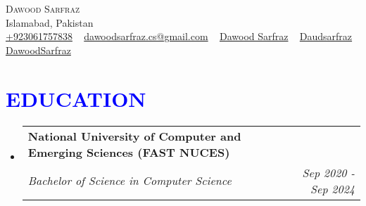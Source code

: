 \documentclass[letterpaper,11pt]{article}
\makeatletter
\newcommand{\resumeSubheading}[4]{
	\vspace{-2pt}\item
	\begin{tabular*}{1.0\textwidth}[t]{l@{\extracolsep{\fill}}r}
		\textbf{\large#1} & \textbf{\small #2} \\
		\textit{\large#3} & \textit{\small #4} \\
		
	\end{tabular*}\vspace{-7pt}
}
\newcommand{\resumeSubHeadingListStart}{\begin{itemize}[leftmargin=0.0in, label={}]}
\newcommand{\resumeSubHeadingListEnd}{\end{itemize}}
\makeatother
\begin{document}
	
	
	
	\begin{center}
		{\Huge \scshape Dawood Sarfraz} \\ \vspace{1pt}
		Islamabad, Pakistan \\ \vspace{1pt}
		\small 
		\href{tel:+9203061757838}{\raisebox{-0.1\height}{\faPhone} {+923061757838}} ~ 
		\href{mailto:yourname@gmail.com}{\raisebox{-0.2\height}{\faEnvelope} {dawoodsarfraz.cs@gmail.com}} ~ 
		\href{https://linkedin.com/in/dawood-sarfraz-0466541b6}{\raisebox{-0.2\height}{\faLinkedin} {Dawood Sarfraz}} ~
		\href{https://github.com/Daudsarfraz}{\raisebox{-0.2\height}{\faGithub} 
			{Daudsarfraz}} ~
		\href{https://daudsarfraz.github.io/DawoodSarfraz/}{\raisebox{-0.2\height}{\faGlobe} {DawoodSarfraz}}
		\vspace{-5pt}
	\end{center}
	
	
	\section{\textcolor{blue}{EDUCATION}}
	\resumeSubHeadingListStart
	\resumeSubheading
	{National University of Computer and Emerging Sciences (FAST NUCES)}{}
	{Bachelor of Science in Computer Science }{Sep 2020 - Sep 2024}
	\resumeSubHeadingListEnd
	\vspace{-10pt}
	
	
\end{document}
